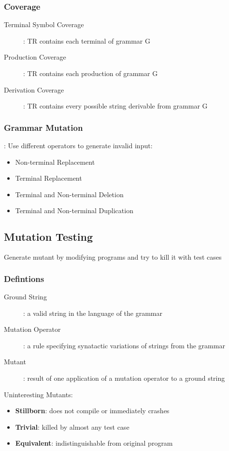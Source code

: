 \documentclass[]{article}
\theoremstyle{definition}
\begin{document}
			\subsubsection{Coverage}
				\begin{description}
					\item[Terminal Symbol Coverage]: TR contains each terminal of grammar G
					\item[Production Coverage]: TR contains each production of grammar G
					\item[Derivation Coverage]: TR contains every possible string derivable from grammar G
				\end{description}
			\subsubsection{Grammar Mutation}:
				Use different operators to generate invalid input:
				\begin{itemize}
					\item Non-terminal Replacement
					\item Terminal Replacement
					\item Terminal and Non-terminal Deletion
					\item Terminal and Non-terminal Duplication
				\end{itemize}
		\subsection{Mutation Testing}
			Generate mutant by modifying programs and try to kill it with test cases 
			\subsubsection{Defintions}
				\begin{description}
					\item[Ground String]: a valid string in the language of the grammar
					\item[Mutation Operator]: a rule specifying synatactic variations of strings from the grammar
					\item[Mutant]: result of one application of a mutation operator to a ground string
				\end{description}
				Uninteresting Mutants:
				\begin{itemize}
					\item \textbf{Stillborn}: does not compile or immediately crashes
					\item \textbf{Trivial}: killed by almost any test case
					\item \textbf{Equivalent}: indistinguishable from original program
				\end{itemize}
\end{document}
